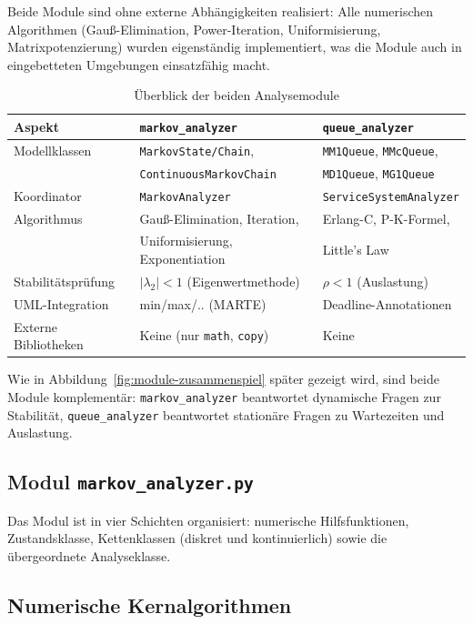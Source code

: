 ﻿\documentclass[a4paper,12pt]{report}
\theoremstyle{definition}
\begin{document}
Beide Module sind ohne externe Abhängigkeiten realisiert: Alle numerischen
Algorithmen (Gauß-Elimination, Power-Iteration, Uniformisierung,
Matrixpotenzierung) wurden eigenständig implementiert, was die Module
auch in eingebetteten Umgebungen einsatzfähig macht.

\begin{table}[H]
	\centering
	\begin{tabular}{@{}lll@{}}
		\toprule
		\textbf{Aspekt} & \textbf{\texttt{markov\_analyzer}} & \textbf{\texttt{queue\_analyzer}} \\
		\midrule
		Modellklassen & \texttt{MarkovState/Chain}, &
		\texttt{MM1Queue}, \texttt{MMcQueue}, \\
		& \texttt{ContinuousMarkovChain} & \texttt{MD1Queue}, \texttt{MG1Queue} \\
		Koordinator & \texttt{MarkovAnalyzer} & \texttt{ServiceSystemAnalyzer} \\
		Algorithmus & Gauß-Elimination, Iteration, & Erlang-C, P-K-Formel, \\
		& Uniformisierung, Exponentiation & Little's Law \\
		Stabilitätsprüfung & $|\lambda_2| < 1$ (Eigenwertmethode) & $\rho < 1$ (Auslastung) \\
		UML-Integration & min/max/.. (MARTE) & Deadline-Annotationen \\
		Externe Bibliotheken & Keine (nur \texttt{math}, \texttt{copy}) & Keine \\
		\bottomrule
	\end{tabular}
	\caption{Überblick der beiden Analysemodule}
\label{tab:modul-overview}
	\label{tab:module-uebersicht}
\end{table}

Wie in Abbildung~\ref{fig:module-zusammenspiel} später gezeigt wird, sind beide Module komplementär: \texttt{markov\_analyzer} beantwortet dynamische Fragen zur Stabilität, \texttt{queue\_analyzer} beantwortet stationäre Fragen zu Wartezeiten und Auslastung.

\subsection{Modul \texttt{markov\_analyzer.py}}
\label{sec:markov-analyzer-impl}

Das Modul ist in vier Schichten organisiert: numerische Hilfsfunktionen,
Zustandsklasse, Kettenklassen (diskret und kontinuierlich) sowie die
übergeordnete Analyseklasse.

\subsection{Numerische Kernalgorithmen}
\end{document}
